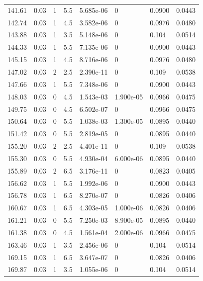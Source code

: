 \documentclass[preview]{standalone}
\begin{document}
{{{{\begin{tabular}{L{1.2cm}C{1.2cm} C{0.3cm}C{0.5cm} C{1.4cm}C{1.4cm} C{1.4cm}C{1.4cm}}
  141.61  &  0.03  & 1     & 5.5 &  5.685e-06  & 0  & 0.0900 &  0.0443   \\ 
  142.74  &  0.03  & 1     & 4.5 &  3.582e-06  & 0  & 0.0976 &  0.0480   \\ 
  143.88  &  0.03  & 1     & 3.5 &  5.148e-06  & 0  & 0.104 &  0.0514   \\ 
  144.33  &  0.03  & 1     & 5.5 &  7.135e-06  & 0  & 0.0900 &  0.0443   \\ 
  145.15  &  0.03  & 1     & 4.5 &  8.716e-06  & 0  & 0.0976 &  0.0480   \\ 
  147.02  &  0.03  & 2     & 2.5 &  2.390e-11  & 0  & 0.109 &  0.0538   \\ 
  147.66  &  0.03  & 1     & 5.5 &  7.348e-06  & 0  & 0.0900 &  0.0443   \\ 
  148.03  &  0.03  & 0     & 4.5 &  1.543e-03  & 1.900e-05  & 0.0966 &  0.0475   \\ 
  149.75  &  0.03  & 0     & 4.5 &  6.502e-07  & 0  & 0.0966 &  0.0475   \\ 
  150.64  &  0.03  & 0     & 5.5 &  1.038e-03  & 1.300e-05  & 0.0895 &  0.0440   \\ 
  151.42  &  0.03  & 0     & 5.5 &  2.819e-05  & 0  & 0.0895 &  0.0440   \\ 
  155.20  &  0.03  & 2     & 2.5 &  4.401e-11  & 0  & 0.109 &  0.0538   \\ 
  155.30  &  0.03  & 0     & 5.5 &  4.930e-04  & 6.000e-06  & 0.0895 &  0.0440   \\ 
  155.89  &  0.03  & 2     & 6.5 &  3.176e-11  & 0  & 0.0823 &  0.0405   \\ 
  156.62  &  0.03  & 1     & 5.5 &  1.992e-06  & 0  & 0.0900 &  0.0443   \\ 
  156.78  &  0.03  & 1     & 6.5 &  8.270e-07  & 0  & 0.0826 &  0.0406   \\ 
  160.67  &  0.03  & 1     & 6.5 &  4.303e-05  & 1.000e-06  & 0.0826 &  0.0406   \\ 
  161.21  &  0.03  & 0     & 5.5 &  7.250e-03  & 8.900e-05  & 0.0895 &  0.0440   \\ 
  161.38  &  0.03  & 0     & 4.5 &  1.561e-04  & 2.000e-06  & 0.0966 &  0.0475   \\ 
  163.46  &  0.03  & 1     & 3.5 &  2.456e-06  & 0  & 0.104 &  0.0514   \\ 
  169.15  &  0.03  & 1     & 6.5 &  3.647e-07  & 0  & 0.0826 &  0.0406   \\ 
  169.87  &  0.03  & 1     & 3.5 &  1.055e-06  & 0  & 0.104 &  0.0514   \\ 

\end{tabular}}}}}
\end{document}
